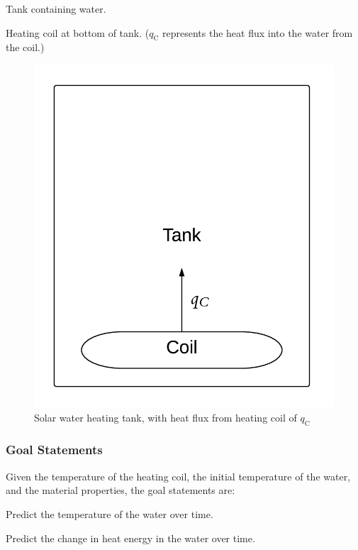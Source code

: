 \documentclass[12pt]{article}
\begin{document}
\begin{description}[font=\normalfont]
\item[PS1:]{Tank containing water.}
\item[PS2:]{Heating coil at bottom of tank. (${q_{\text{C}}}$ represents the heat flux into the water from the coil.)}
\end{description}
\begin{figure}[H]
\begin{center}
\includegraphics[width=\textwidth]{../../../../datafiles/swhsnopcm/TankWaterOnly.png}
\caption{Solar water heating tank, with heat flux from heating coil of ${q_{\text{C}}}$}
\label{Figure:Tank}
\end{center}
\end{figure}
\subsubsection{Goal Statements}
\label{Sec:GoalStmt}
Given the temperature of the heating coil, the initial temperature of the water, and the material properties, the goal statements are:

\begin{description}[font=\normalfont]
\item[Predict-Water-Temperature:\phantomsection\label{waterTempGS}]{Predict the temperature of the water over time.}
\item[Predict-Water-Energy:\phantomsection\label{waterEnergyGS}]{Predict the change in heat energy in the water over time.}
\end{description}
\end{document}
